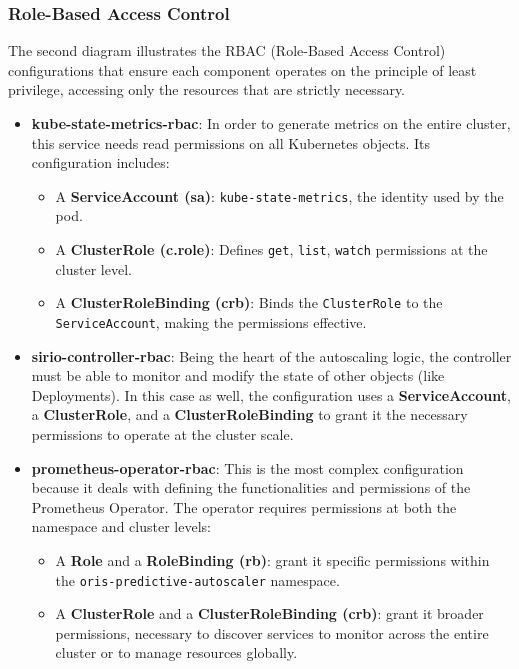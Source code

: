 \subsubsection{Role-Based Access Control}
 The second diagram illustrates the RBAC (Role-Based Access Control) configurations that ensure each component operates on the principle of least privilege, accessing only the resources that are strictly necessary.

\begin{itemize}
    \item \textbf{kube-state-metrics-rbac}: In order to generate metrics on the entire cluster, this service needs read permissions on all Kubernetes objects. Its configuration includes:
    \begin{itemize}
        \item A \textbf{ServiceAccount (sa)}: \verb|kube-state-metrics|, the identity used by the pod.
        \item A \textbf{ClusterRole (c.role)}: Defines \verb|get|, \verb|list|, \verb|watch| permissions at the cluster level.
        \item A \textbf{ClusterRoleBinding (crb)}: Binds the \verb|ClusterRole| to the \verb|ServiceAccount|, making the permissions effective.
    \end{itemize}
    \item \textbf{sirio-controller-rbac}: Being the heart of the autoscaling logic, the controller must be able to monitor and modify the state of other objects (like Deployments). In this case as well, the configuration uses a \textbf{ServiceAccount}, a \textbf{ClusterRole}, and a \textbf{ClusterRoleBinding} to grant it the necessary permissions to operate at the cluster scale.
    \item \textbf{prometheus-operator-rbac}: This is the most complex configuration because it deals with defining the functionalities and permissions of the Prometheus Operator. The operator requires permissions at both the namespace and cluster levels:
    \begin{itemize}
        \item A \textbf{Role} and a \textbf{RoleBinding (rb)}: grant it specific permissions within the \verb|oris-predictive-autoscaler| namespace.
        \item A \textbf{ClusterRole} and a \textbf{ClusterRoleBinding (crb)}: grant it broader permissions, necessary to discover services to monitor across the entire cluster or to manage resources globally.
    \end{itemize}
\end{itemize}

